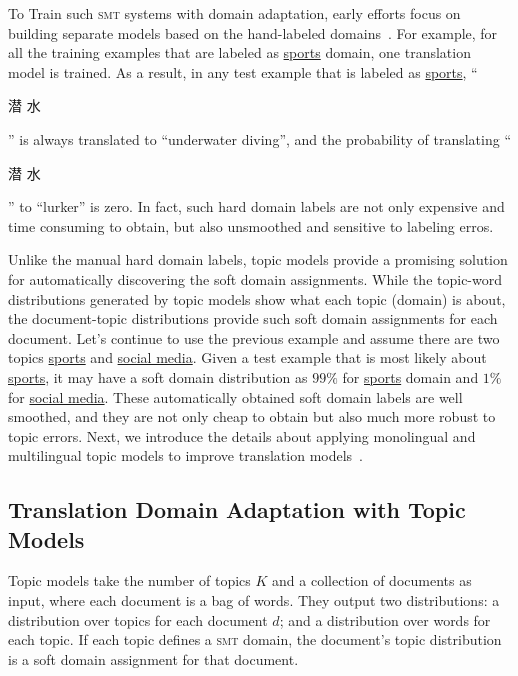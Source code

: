 To Train such \textsc{smt} systems with domain adaptation, early
efforts focus on building separate models based on the hand-labeled
domains~\citep{foster-07,matsoukas-09,chiang-11}. For example, for all
the training examples that are labeled as \underline{sports} domain,
one translation model is trained. As a result, in any test example
that is labeled as \underline{sports}, ``\begin{CJK*}{UTF8}{gbsn}潜
  水\end{CJK*}'' is always translated to ``underwater diving'', and
  the probability of translating ``\begin{CJK*}{UTF8}{gbsn}潜
    水\end{CJK*}'' to ``lurker'' is zero. In fact, such hard domain
    labels are not only expensive and time consuming to obtain, but
    also unsmoothed and sensitive to labeling erros.

Unlike the manual hard domain labels, topic models provide a promising
solution for automatically discovering the soft domain
assignments. While the topic-word distributions generated by topic
models show what each topic (domain) is about, the document-topic
distributions provide such soft domain assignments for each
document. Let's continue to use the previous example and assume there
are two topics \underline{sports} and \underline{social media}. Given
a test example that is most likely about \underline{sports}, it may
have a soft domain distribution as $99\%$ for \underline{sports}
domain and $1\%$ for \underline{social media}. These automatically
obtained soft domain labels are well smoothed, and they are not only
cheap to obtain but also much more robust to topic errors. Next, we
introduce the details about applying monolingual and multilingual
topic models to improve translation models~\citep{Eidelman-12,hu-14}.


\subsection{Translation Domain Adaptation with Topic Models}

Topic models take the number of topics $K$ and a collection of
documents as input, where each document is a bag of words. They output
two distributions: a distribution over topics for each document $d$;
and a distribution over words for each topic. If each topic defines a
\textsc{smt} domain, the document's topic distribution is a soft
domain assignment for that document.

